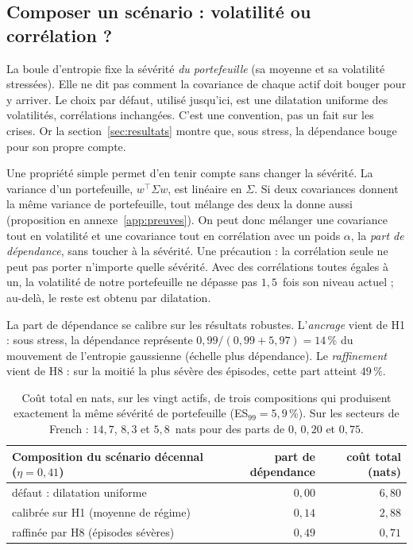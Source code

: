 \documentclass[11pt]{article}
\theoremstyle{definition}
\begin{document}
\subsection{Composer un scénario : volatilité ou corrélation ?}
\label{sec:composition}

La boule d'entropie fixe la sévérité \emph{du portefeuille} (sa moyenne et sa
volatilité stressées). Elle ne dit pas comment la covariance de chaque actif
doit bouger pour y arriver. Le choix par défaut, utilisé jusqu'ici, est une
dilatation uniforme des volatilités, corrélations inchangées. C'est une
convention, pas un fait sur les crises. Or la section~\ref{sec:resultats}
montre que, sous stress, la dépendance bouge pour son propre compte.

Une propriété simple permet d'en tenir compte sans changer la sévérité. La
variance d'un portefeuille, $w^\top\Sigma w$, est linéaire en $\Sigma$. Si deux
covariances donnent la même variance de portefeuille, tout mélange des deux la
donne aussi (proposition en annexe~\ref{app:preuves}). On peut donc mélanger
une covariance \og tout en volatilité \fg{} et une covariance \og tout en
corrélation \fg{} avec un poids $\alpha$, la \emph{part de dépendance}, sans
toucher à la sévérité. Une précaution : la corrélation seule ne peut pas
porter n'importe quelle sévérité. Avec des corrélations toutes égales à un, la
volatilité de notre portefeuille ne dépasse pas $1{,}5$~fois son niveau actuel ;
au-delà, le reste est obtenu par dilatation.

La part de dépendance se calibre sur les résultats robustes. L'\emph{ancrage}
vient de H1 : sous stress, la dépendance représente $0{,}99/(0{,}99+5{,}97)
=14\,\%$ du mouvement de l'entropie gaussienne (échelle plus dépendance). Le \emph{raffinement} vient de H8 :
sur la moitié la plus sévère des épisodes, cette part atteint $49\,\%$.

\begin{table}[htbp]
\centering
\small
\begin{tabular}{@{}lrr@{}}
\toprule
Composition du scénario décennal ($\eta=0{,}41$) & part de dépendance & coût total (nats) \\
\midrule
défaut : dilatation uniforme & $0{,}00$ & $6{,}80$ \\
calibrée sur H1 (moyenne de régime) & $0{,}14$ & $2{,}88$ \\
raffinée par H8 (épisodes sévères) & $0{,}49$ & $0{,}71$ \\
\bottomrule
\end{tabular}
\caption{Coût total en nats, sur les vingt actifs, de trois compositions qui
produisent exactement la même sévérité de portefeuille (ES$_{99}=5{,}9\,\%$).
Sur les secteurs de French : $14{,}7$, $8{,}3$ et $5{,}8$~nats pour des parts
de $0$, $0{,}20$ et $0{,}75$.}
\label{tab:composition}
\end{table}
\end{document}

